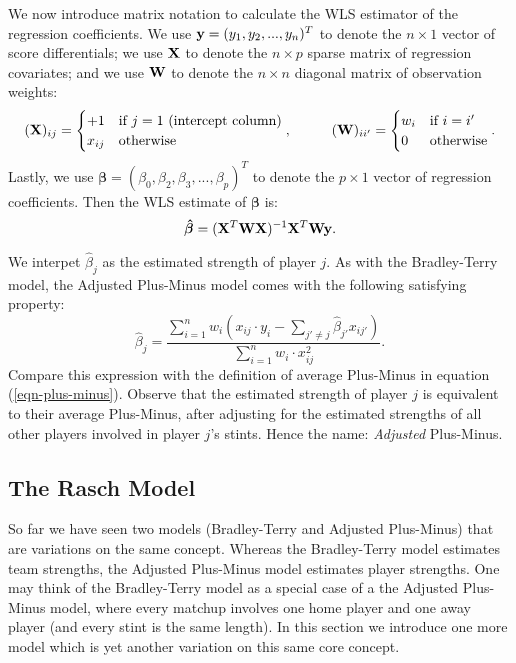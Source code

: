 \documentclass{article}
\begin{document}
  We now introduce matrix notation to calculate the WLS estimator of the regression coefficients. We use ${\bf y} = (y_1, y_2, ..., y_n)^T$ to denote the $n \times 1$ vector of score differentials; we use $\bf X$ to denote the $n \times p$ sparse matrix of regression covariates; and we use $\bf W$ to denote the $n \times n$ diagonal matrix of observation weights:
  \begin{equation*}
    ({\bf X})_{ij} = \begin{cases}
      +1 & \mbox{if $j = 1$ (intercept column)}\\
      x_{ij} & \mbox{otherwise}
    \end{cases},
    \hspace{1cm}
    ({\bf W})_{ii'} = \begin{cases}
      w_i & \mbox{if $i = i'$}\\
      0 & \mbox{otherwise}
    \end{cases}.
  \end{equation*}
  Lastly, we use $\boldsymbol{\beta} = (\beta_0, \beta_2, \beta_3, ..., \beta_p)^T$ to denote the $p \times 1$ vector of regression coefficients. Then the WLS estimate of $\boldsymbol{\beta}$ is:
  \begin{equation*}
    \boldsymbol{\hat\beta} = ({\bf X}^T {\bf W} {\bf X})^{-1} {\bf X}^T {\bf W} {\bf y}.
  \end{equation*}

  We interpet $\hat\beta_j$ as the estimated strength of player $j$. As with the Bradley-Terry model, the Adjusted Plus-Minus model comes with the following satisfying property:
  \begin{equation*}
    \hat\beta_j = \frac{
      \sum_{i = 1}^n w_i \left(x_{ij} \cdot y_i - \sum_{j' \neq j} \hat\beta_{j'}x_{ij'} \right)
    }{
      \sum_{i = 1}^n w_i \cdot x_{ij}^2
    }.
  \end{equation*}
  Compare this expression with the definition of average Plus-Minus in equation (\ref{eqn-plus-minus}). Observe that the estimated strength of player $j$ is equivalent to their average Plus-Minus, after adjusting for the estimated strengths of all other players involved in player $j$'s stints. Hence the name: {\it Adjusted} Plus-Minus.

  \subsection{\sc The Rasch Model}

  So far we have seen two models (Bradley-Terry and Adjusted Plus-Minus) that are variations on the same concept. Whereas the Bradley-Terry model estimates team strengths, the Adjusted Plus-Minus model estimates player strengths. One may think of the Bradley-Terry model as a special case of a the Adjusted Plus-Minus model, where every matchup involves one home player and one away player (and every stint is the same length). In this section we introduce one more model which is yet another variation on this same core concept.
\end{document}
